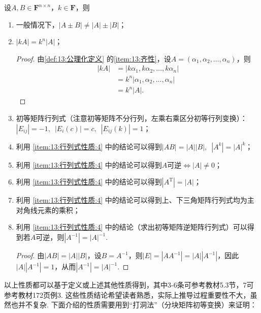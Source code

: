 设$A,B \in \mathbf{F}^{n \times n}$，$k \in \mathbf{F}$，则
\begin{enumerate}
    \item 一般情况下，$|A \pm B| \neq |A|\pm|B|$；

    \item $|kA|=k^n|A|$；
    \begin{proof}
        由\autoref{def:13:公理化定义} 的\ref*{item:13:齐性}，设$A=(\alpha_1,\alpha_2,\ldots,\alpha_n)$，则
        \begin{align*}
            |kA| &=|k\alpha_1,k\alpha_2,\ldots,k\alpha_n| \\
                 &=k^n|\alpha_1,\alpha_2,\ldots,\alpha_n| \\
                 &=k^n|A|.
        \end{align*}
    \end{proof}

    \item \label{item:13:行列式性质:4}
          初等矩阵行列式（注意初等矩阵不分行列，左乘右乘区分初等行列变换）：\\
          $|E_{ij}|=-1,\enspace |E_i(c)|=c,\enspace |E_{ij}(k)|=1$；

    \item 利用 \ref*{item:13:行列式性质:4} 中的结论可以得到$|AB|=|A||B|,\enspace|A^k|=|A|^k$；

    \item 利用 \ref*{item:13:行列式性质:4} 中的结论可以得到$A$可逆$\iff |A| \neq 0$；

    \item 利用 \ref*{item:13:行列式性质:4} 中的结论可以得到$|A^\mathrm{T}|=|A|$；

    \item 利用 \ref*{item:13:行列式性质:4} 中的结论可以得到上、下三角矩阵行列式均为主对角线元素的乘积；

    \item 利用 \ref*{item:13:行列式性质:4} 中的结论（求出初等矩阵逆矩阵行列式）可以得到若$A$可逆，则$|A^{-1}|=|A|^{-1}$.
    \begin{proof}
        由$|AB|=|A||B|$，设$B=A^{-1}$，则$|E|=|AA^{-1}|=|A||A^{-1}|$，因此$|A||A^{-1}|=1$，从而$|A^{-1}|=|A|^{-1}$.
    \end{proof}
\end{enumerate}

以上性质都可以基于定义或上述其他性质得到，其中3-6条可参考教材5.3节，7可参考教材172页例3. 这些性质结论希望读者熟悉，实际上推导过程重要性不大，虽然也并不复杂. 下面介绍的性质需要用到``打洞法''（分块矩阵初等变换）来证明：

